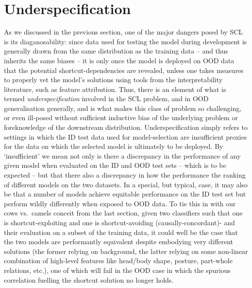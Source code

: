 \section{Underspecification}\label{sub:underspecification}
 
As we discussed in the previous section, one of the major dangers posed by \ac{SCL} is its
diaganosability: since data used for testing the model during development is generally drawn from
the same distribution as the training data -- and thus inherits the same biases -- it is only once
the model is deployed on \ac{OOD} data that the potential shortcut-dependencies are revealed,
unless one takes measures to properly vet the model's solutions using tools from the
interpretability literature, such as feature attribution.
%
Thus, there is an element of what is termed \emph{underspecification} involved in the \ac{SCL}
problem, and in \ac{OOD} generalisation generally, and is what makes this class of problem so
challenging, or even ill-posed without sufficient inductive bias of the underlying problem or
foreknowledge of the downstream distribution.
%
Underspecification simply refers to settings in which the \ac{ID} test data used for
model-selection are insufficient proxies for the data on which the selected model is ultimately to
be deployed.
%
By `insufficient' we mean not only is there a discrepancy in the performance of any given model
when evaluated on the \ac{ID} and \ac{OOD} test sets -- which is to be expected -- but that there
also a discrepancy in how the performance the ranking of different models on the two datasets.
%
In a special, but typical, case, it may also be that a number of models achieve equitable
performance on the \ac{ID} test set but perform wildly differently when exposed to \ac{OOD} data.
%
To tie this in with our cows vs.\ camels conceit from the last section, given two classifiers such
that one is shortcut-exploiting and one is shortcut-avoiding (causally-concordant)- and their
evaluation on a subset of the training data, it could well be the case that the two models are
performantly equivalent despite embodying very different solutions (the former relying on
background, the latter relying on some non-linear combination of high-level features like head/body
shape, posture, part-whole relations, etc.), one of which will fail in the \ac{OOD} case in which
the spurious correlation fuelling the shortcut solution no longer holds.


